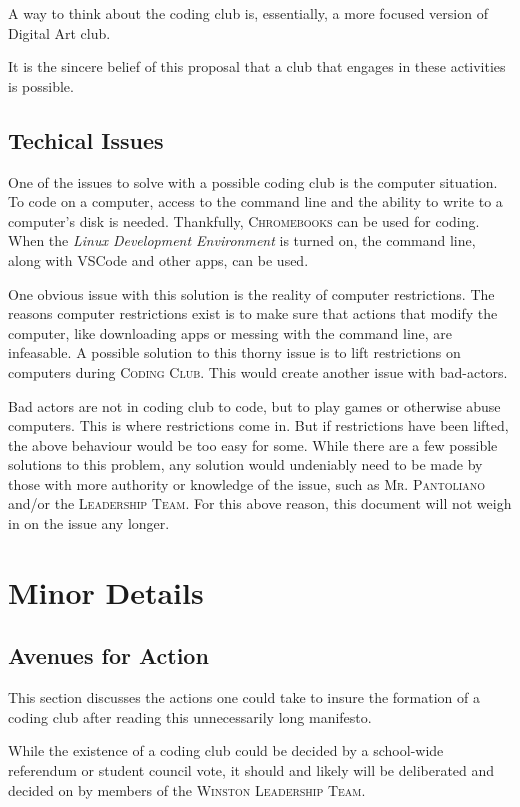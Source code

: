 \documentclass{report}
\begin{document}
A way to think about the coding club is, essentially, a more focused version of Digital Art club.

It is the sincere belief of this proposal that a club that engages in these activities is possible.

\subsection*{Techical Issues}

One of the issues to solve with a possible coding club is the computer situation. To code on a computer, access to the command line and the ability to write to a computer's disk is needed. Thankfully, \textsc{Chromebooks} can be used for coding. When the \textit{Linux Development Environment} is turned on, the command line, along with VSCode and other apps, can be used.

One obvious issue with this solution is the reality of computer restrictions. The reasons computer restrictions exist is to make sure that actions that modify the computer, like downloading apps or messing with the command line, are infeasable. A possible solution to this thorny issue is to lift restrictions on computers during \textsc{Coding Club}. This would create another issue with bad-actors.

Bad actors are not in coding club to code, but to play games or otherwise abuse computers. This is where restrictions come in. But if restrictions have been lifted, the above behaviour would be too easy for some. While there are a few possible solutions to this problem, any solution would undeniably need to be made by those with more authority or knowledge of the issue, such as \textsc{Mr. Pantoliano} and/or the \textsc{Leadership Team}. For this above reason, this document will not weigh in on the issue any longer.

\section*{Minor Details}

\subsection*{Avenues for Action}

This section discusses the actions one could take to insure the formation of a coding club after reading this unnecessarily long manifesto.

While the existence of a coding club could be decided by a school-wide referendum or student council vote, it should and likely will be deliberated and decided on by members of the \textsc{Winston Leadership Team}.
\end{document}

